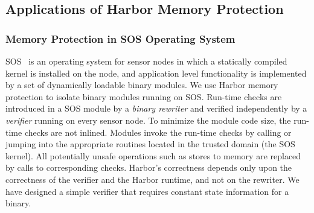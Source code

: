 
\subsection{Applications of Harbor Memory Protection}
%
\subsubsection{Memory Protection in SOS Operating System}
%
SOS~\cite{ram05sos} is an operating system for sensor nodes in which a
statically compiled kernel is installed on the node, and application
level functionality is implemented by a set of dynamically loadable
binary modules.
%
We use Harbor memory protection to isolate binary modules running
on SOS.
%
Run-time checks are introduced in a SOS module by a \emph{binary rewriter} and
verified independently by a \emph{verifier} running on every sensor
node.
%
To minimize the module code size, the run-time checks are not inlined.
%
Modules invoke the run-time checks by calling or jumping into the
appropriate routines located in the trusted domain (the SOS kernel).
%
All potentially unsafe operations such as stores to memory are replaced
by calls to corresponding checks.
%
%
Harbor's correctness depends only upon the correctness of the
verifier and the Harbor runtime, and not on the rewriter.
%
%
We have designed a simple verifier that requires constant state
information for a binary.
%
